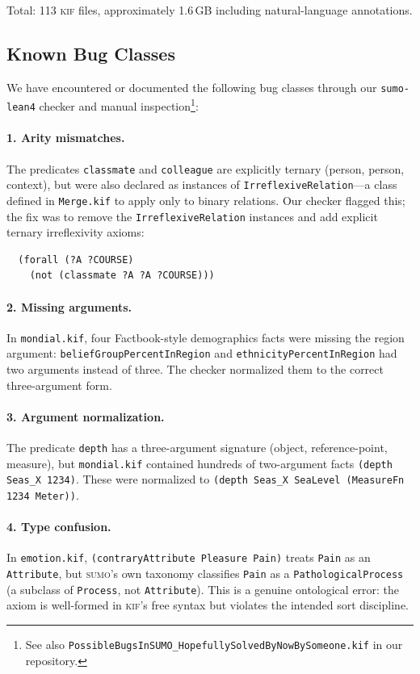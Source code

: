 \documentclass[11pt]{article}
\newcommand{\KIF}{\textsc{kif}}
\newcommand{\SUMO}{\textsc{sumo}}
\theoremstyle{definition}
\theoremstyle{plain}
\begin{document}
Total: 113 \KIF{} files, approximately 1.6\,GB including
natural-language annotations.

\subsection{Known Bug Classes}

We have encountered or documented the following bug classes through
our \texttt{sumo-lean4} checker and manual
inspection\footnote{See also \texttt{PossibleBugsInSUMO\_HopefullySolvedByNowBySomeone.kif}
in our repository.}:

\paragraph{1. Arity mismatches.}
The predicates \texttt{classmate} and \texttt{colleague} are
explicitly ternary (person, person, context), but were also declared as
instances of \texttt{IrreflexiveRelation}---a class defined in
\texttt{Merge.kif} to apply only to binary relations.
Our checker flagged this; the fix was to remove the
\texttt{IrreflexiveRelation} instances and add explicit ternary
irreflexivity axioms:
\begin{verbatim}
  (forall (?A ?COURSE)
    (not (classmate ?A ?A ?COURSE)))
\end{verbatim}

\paragraph{2. Missing arguments.}
In \texttt{mondial.kif}, four Factbook-style demographics facts
were missing the region argument:
\texttt{beliefGroupPercentInRegion} and
\texttt{ethnicityPercentInRegion} had two arguments instead of three.
The checker normalized them to the correct three-argument form.

\paragraph{3. Argument normalization.}
The predicate \texttt{depth} has a three-argument signature
(object, reference-point, measure), but \texttt{mondial.kif}
contained hundreds of two-argument facts
\texttt{(depth Seas\_X 1234)}.
These were normalized to
\texttt{(depth Seas\_X SeaLevel (MeasureFn 1234 Meter))}.

\paragraph{4. Type confusion.}
In \texttt{emotion.kif}, \texttt{(contraryAttribute Pleasure Pain)}
treats \texttt{Pain} as an \texttt{Attribute}, but \SUMO{}'s own
taxonomy classifies \texttt{Pain} as a \texttt{PathologicalProcess}
(a subclass of \texttt{Process}, not \texttt{Attribute}).
This is a genuine ontological error: the axiom is well-formed in
\KIF{}'s free syntax but violates the intended sort discipline.
\end{document}

